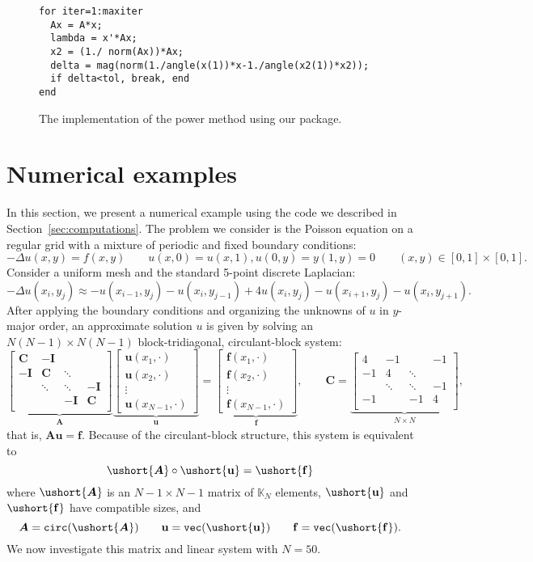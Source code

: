 \documentclass[1p,authoryear,letterpaper]{elsarticle}
\DeclareMathOperator{\tcirc}{\texttt{circ}}
\DeclareMathOperator{\tvec}{\texttt{vec}}
\providecommand{\KK}{\mathbb{K}}
\providecommand{\bmat}[1]{\begin{bmatrix} #1 \end{bmatrix}}
\providecommand{\mat}{\boldsymbol}
\renewcommand{\vec}{\mathbf}
\providecommand{\mA}{\ensuremath{\mat{A}}}
\providecommand{\mC}{\ensuremath{\mat{C}}}
\providecommand{\mI}{\ensuremath{\mat{I}}}
\providecommand{\vf}{\ensuremath{\vec{f}}}
\providecommand{\vu}{\ensuremath{\vec{u}}}
\newcommand{\cel}[1]{\ushort{#1}}
\newcommand{\celm}[1]{\cel{\mat{#1}}}
\newcommand{\celv}[1]{\cel{\vec{#1}}}
\newcommand{\cvf}{\ensuremath{\celv{f}}}
\newcommand{\cvu}{\ensuremath{\celv{u}}}
\providecommand{\cmA}{\ensuremath{\celm{A}}}
\begin{document}
\begin{figure}
\begin{verbatim}
for iter=1:maxiter
  Ax = A*x;
  lambda = x'*Ax;
  x2 = (1./ norm(Ax))*Ax;
  delta = mag(norm(1./angle(x(1))*x-1./angle(x2(1))*x2));
  if delta<tol, break, end
end
\end{verbatim}
\caption{The implementation of the power method using our package.}
\label{fig:camat-power}
\end{figure}





\section{Numerical examples}
\label{sec:example}

In this section, we present a numerical example using
the code we described in Section~\ref{sec:computations}.  The
problem we consider is the Poisson equation on a regular
grid with a mixture of periodic and fixed boundary conditions:
\[ -\Delta u(x,y) = f(x,y) \qquad u(x,0) = u(x,1), u(0,y) = y(1,y) = 0 \qquad (x,y) \in [0,1] \times [0,1]. \]
Consider a uniform mesh and the standard 5-point discrete Laplacian:
\[ -\Delta u(x_i,y_j) \approx -u(x_{i-1},y_j) -u(x_i,y_{j-1}) + 4 u(x_i,y_j) - u(x_{i+1},y_j) - u(x_i,y_{j+1}). \]
After applying the boundary conditions and organizing the
unknowns of $u$
in $y$-major order, an approximate solution $u$ is given
by solving an $N(N-1)\times N(N-1)$ block-tridiagonal, circulant-block system:
\[ \underbrace{\bmat{
    \mC & -\mI \\
    -\mI & \mC & \ddots \\
    & \ddots & \ddots & -\mI \\
    & & -\mI & \mC \\
   }}_{\mA} \underbrace{\bmat {
    \vu(x_1, \cdot) \\
    \vu(x_2, \cdot) \\
    \vdots \\
    \vu(x_{N-1}, \cdot)
  }}_{\vu} = \underbrace{\bmat{
    \vf(x_1, \cdot) \\
    \vf(x_2, \cdot) \\
    \vdots \\
    \vf(x_{N-1}, \cdot)
  }}_{\vf}, \qquad
  \mC = \underbrace{\bmat{
    4 & -1 & & -1\\
    -1 & 4 & \ddots \\
    & \ddots & \ddots & -1 \\
    -1 & & -1 & 4 \\
   }}_{N \times N} ,
  \]
that is, $\mA \vu = \vf$.
Because of the circulant-block structure, this system
is equivalent to
\[ \cmA \circ \cvu = \cvf \]
where $\cmA$ is an ${N-1} \times {N-1}$ matrix of $\KK_{N}$ elements,
$\cvu$ and $\cvf$ have compatible sizes, and
\[ \mA =\tcirc(\cmA) \qquad  \vu =  \tvec(\cvu)  \qquad \vf = \tvec(\cvf). \]  We now investigate this matrix and linear system
with $N = 50$.
\end{document}
